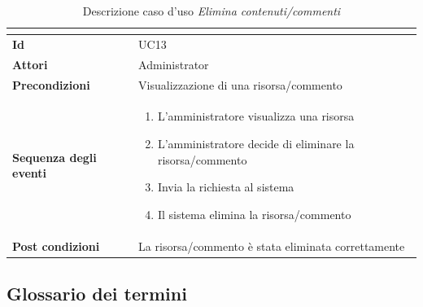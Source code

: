 \documentclass[a4paper]{article}
\begin{document}
\begin{table}[H]
    \centering
    \renewcommand{\arraystretch}{1.5}
    \begin{tabular}{|>{\bfseries}l|p{10cm}|}
        \hline
        \multicolumn{2}{|c|}{\textbf{Caso d'uso: Elimina contenuti/commenti}} \\
        \hline
        \textbf{Id} & UC13 \\ \hline
        \textbf{Attori} & Administrator \\ \hline
        \textbf{Precondizioni} & Visualizzazione di una risorsa/commento \\ \hline
        \textbf{Sequenza degli eventi} &
        \begin{enumerate}
            \item L'amministratore visualizza una risorsa
            \item L'amministratore decide di eliminare la risorsa/commento
            \item Invia la richiesta al sistema
            \item Il sistema elimina la risorsa/commento
        \end{enumerate}\\ \hline
        \textbf{Post condizioni} & La risorsa/commento è stata eliminata correttamente \\ \hline
    \end{tabular}
    \caption{Descrizione caso d'uso \textit{Elimina contenuti/commenti}}
    \label{tab:delete_content_comments-usecase}
\end{table}


\subsection{Glossario dei termini}
\end{document}
